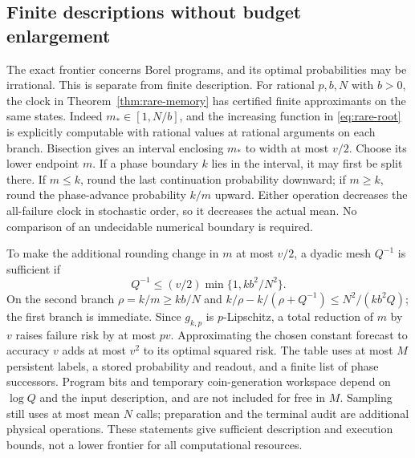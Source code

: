 \subsection{Finite descriptions without budget enlargement}
The exact frontier concerns Borel programs, and its optimal probabilities may be irrational. This is separate from finite description. For rational $p,b,N$ with $b>0$, the clock in Theorem~\ref{thm:rare-memory} has certified finite approximants on the same states. Indeed $m_*\in[1,N/b]$, and the increasing function in \eqref{eq:rare-root} is explicitly computable with rational values at rational arguments on each branch. Bisection gives an interval enclosing $m_*$ to width at most $v/2$. Choose its lower endpoint $m$. If a phase boundary $k$ lies in the interval, it may first be split there. If $m\le k$, round the last continuation probability downward; if $m\ge k$, round the phase-advance probability $k/m$ upward. Either operation decreases the all-failure clock in stochastic order, so it decreases the actual mean. No comparison of an undecidable numerical boundary is required.

To make the additional rounding change in $m$ at most $v/2$, a dyadic mesh $Q^{-1}$ is sufficient if
\[
 Q^{-1}\le (v/2)\min\{1,kb^2/N^2\}.
\]
On the second branch $\rho=k/m\ge kb/N$ and
$k/\rho-k/(\rho+Q^{-1})\le N^2/(kb^2Q)$; the first branch is immediate. Since $g_{k,p}$ is $p$-Lipschitz, a total reduction of $m$ by $v$ raises failure risk by at most $pv$. Approximating the chosen constant forecast to accuracy $v$ adds at most $v^2$ to its optimal squared risk. The table uses at most $M$ persistent labels, a stored probability and readout, and a finite list of phase successors. Program bits and temporary coin-generation workspace depend on $\log Q$ and the input description, and are not included for free in $M$. Sampling still uses at most mean $N$ calls; preparation and the terminal audit are additional physical operations. These statements give sufficient description and execution bounds, not a lower frontier for all computational resources.
